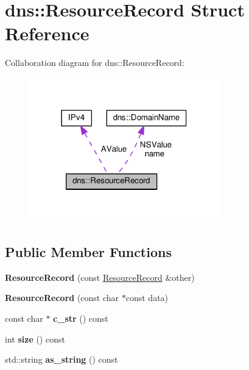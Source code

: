 \hypertarget{structdns_1_1ResourceRecord}{}\section{dns\+:\+:Resource\+Record Struct Reference}
\label{structdns_1_1ResourceRecord}


Collaboration diagram for dns\+:\+:Resource\+Record\+:\nopagebreak
\begin{figure}[H]
\begin{center}
\leavevmode
\includegraphics[width=234pt]{structdns_1_1ResourceRecord__coll__graph}
\end{center}
\end{figure}
\subsection*{Public Member Functions}
\begin{DoxyCompactItemize}
\item 
{\bfseries Resource\+Record} (const \hyperlink{structdns_1_1ResourceRecord}{Resource\+Record} \&other)\hypertarget{structdns_1_1ResourceRecord_a1d953b0a89f6e04b6d28072d776eb3dd}{}\label{structdns_1_1ResourceRecord_a1d953b0a89f6e04b6d28072d776eb3dd}

\item 
{\bfseries Resource\+Record} (const char $\ast$const data)\hypertarget{structdns_1_1ResourceRecord_a0d9cb7a786c964487cd16191fee9c8de}{}\label{structdns_1_1ResourceRecord_a0d9cb7a786c964487cd16191fee9c8de}

\item 
const char $\ast$ {\bfseries c\+\_\+str} () const \hypertarget{structdns_1_1ResourceRecord_a44230c7a2543fcf77060eed526d76fa1}{}\label{structdns_1_1ResourceRecord_a44230c7a2543fcf77060eed526d76fa1}

\item 
int {\bfseries size} () const \hypertarget{structdns_1_1ResourceRecord_ac686d613eaa1567545ec4cb599d22e32}{}\label{structdns_1_1ResourceRecord_ac686d613eaa1567545ec4cb599d22e32}

\item 
std\+::string {\bfseries as\+\_\+string} () const \hypertarget{structdns_1_1ResourceRecord_acbc8eaef9fb71167e40565cbc8f17a0d}{}\label{structdns_1_1ResourceRecord_acbc8eaef9fb71167e40565cbc8f17a0d}

\end{DoxyCompactItemize}
